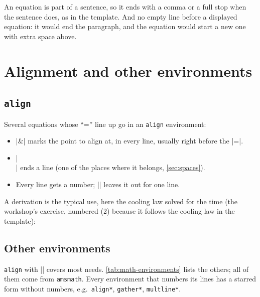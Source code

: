 An equation is part of a sentence, so it ends with a comma or a full stop when the sentence does,
as in the template.
And no empty line before a displayed equation:
it would end the paragraph, and the equation would start a new one with extra space above.

\section{Alignment and other environments}\label{sec:align}

\subsection{\texttt{align}}

Several equations whose \enquote{=} line up go in an \texttt{align} environment:


\begin{itemize}
    \item \code|&| marks the point to align at, in every line, usually right before the \code|=|.
    \item \code|\\| ends a line (one of the places where it belongs, \autoref{sec:spaces}).
    \item Every line gets a number; \code|\notag| leaves it out for one line.
\end{itemize}

A derivation is the typical use, here the cooling law solved for the time
(the workshop's exercise, numbered (2) because it follows the cooling law in the template):


\subsection{Other environments}

\texttt{align} with \code|\notag| covers most needs.
\autoref{tab:math-environments} lists the others; all of them come from \texttt{amsmath}.
Every environment that numbers its lines has a starred form without numbers,
e.g.\ \texttt{align*}, \texttt{gather*}, \texttt{multline*}.

